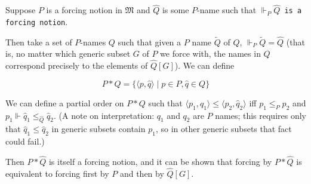 \documentclass[12pt]{article}
\begin{document}
Suppose $P$ is a forcing notion in $\mathfrak{M}$ and $\hat{Q}$ is some $P$-name such that $\Vdash_P \hat{Q}$\texttt{ is a forcing notion}.

Then take a set of $P$-names $Q$ such that given a $P$ name $\tilde{Q}$ of $Q$, $\Vdash_P \tilde{Q}=\hat{Q}$ (that is, no matter which generic subset $G$ of $P$ we force with, the names in $Q$ correspond precisely to the elements of $\hat{Q}[G]$).  We can define

$$P*Q=\{\langle p,\hat{q}\rangle \mid p\in P, \hat{q}\in Q\}$$

We can define a partial order on $P*Q$ such that $\langle p_1,\hat{q}_1\rangle\leq \langle p_2,\hat{q}_2\rangle$ iff $p_1\leq_P p_2$ and $p_1\Vdash \hat{q}_1\leq_{\hat{Q}} \hat{q}_2$.  (A note on interpretation: $q_1$ and $q_2$ are $P$ names; this requires only that $\hat{q}_1\leq \hat{q}_2$ in generic subsets contain $p_1$, so in other generic subsets that fact could fail.)

Then $P*\hat{Q}$ is itself a forcing notion, and it can be shown that forcing by $P*\hat{Q}$ is equivalent to forcing first by $P$ and then by $\hat{Q}[G]$.
\end{document}
